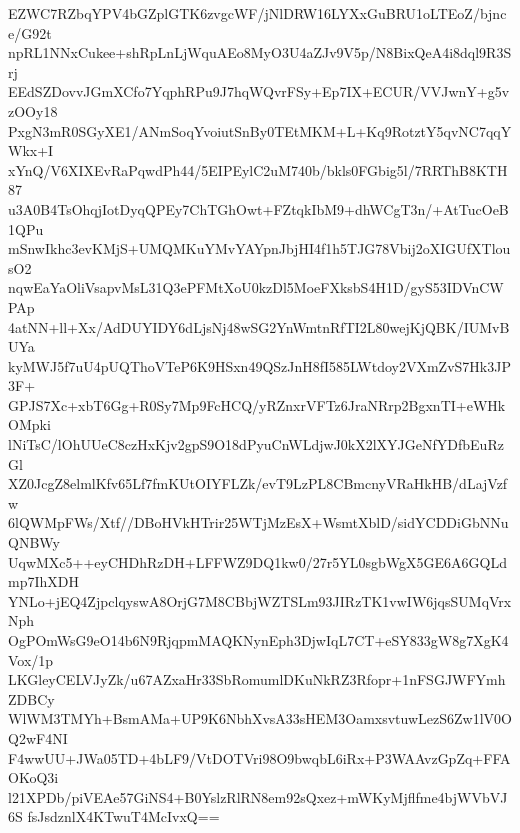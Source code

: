 EZWC7RZbqYPV4bGZplGTK6zvgcWF/jNlDRW16LYXxGuBRU1oLTEoZ/bjnce/G92t
npRL1NNxCukee+shRpLnLjWquAEo8MyO3U4aZJv9V5p/N8BixQeA4i8dql9R3Srj
EEdSZDovvJGmXCfo7YqphRPu9J7hqWQvrFSy+Ep7IX+ECUR/VVJwnY+g5vzOOy18
PxgN3mR0SGyXE1/ANmSoqYvoiutSnBy0TEtMKM+L+Kq9RotztY5qvNC7qqYWkx+I
xYnQ/V6XIXEvRaPqwdPh44/5EIPEylC2uM740b/bkls0FGbig5l/7RRThB8KTH87
u3A0B4TsOhqjIotDyqQPEy7ChTGhOwt+FZtqkIbM9+dhWCgT3n/+AtTucOeB1QPu
mSnwIkhc3evKMjS+UMQMKuYMvYAYpnJbjHI4f1h5TJG78Vbij2oXIGUfXTlousO2
nqwEaYaOliVsapvMsL31Q3ePFMtXoU0kzDl5MoeFXksbS4H1D/gyS53IDVnCWPAp
4atNN+ll+Xx/AdDUYIDY6dLjsNj48wSG2YnWmtnRfTI2L80wejKjQBK/IUMvBUYa
kyMWJ5f7uU4pUQThoVTeP6K9HSxn49QSzJnH8fI585LWtdoy2VXmZvS7Hk3JP3F+
GPJS7Xc+xbT6Gg+R0Sy7Mp9FcHCQ/yRZnxrVFTz6JraNRrp2BgxnTI+eWHkOMpki
lNiTsC/lOhUUeC8czHxKjv2gpS9O18dPyuCnWLdjwJ0kX2lXYJGeNfYDfbEuRzGl
XZ0JcgZ8elmlKfv65Lf7fmKUtOIYFLZk/evT9LzPL8CBmcnyVRaHkHB/dLajVzfw
6lQWMpFWs/Xtf//DBoHVkHTrir25WTjMzEsX+WsmtXblD/sidYCDDiGbNNuQNBWy
UqwMXc5++eyCHDhRzDH+LFFWZ9DQ1kw0/27r5YL0sgbWgX5GE6A6GQLdmp7IhXDH
YNLo+jEQ4ZjpclqyswA8OrjG7M8CBbjWZTSLm93JIRzTK1vwIW6jqsSUMqVrxNph
OgPOmWsG9eO14b6N9RjqpmMAQKNynEph3DjwIqL7CT+eSY833gW8g7XgK4Vox/1p
LKGleyCELVJyZk/u67AZxaHr33SbRomumlDKuNkRZ3Rfopr+1nFSGJWFYmhZDBCy
WlWM3TMYh+BsmAMa+UP9K6NbhXvsA33sHEM3OamxsvtuwLezS6Zw1lV0OQ2wF4NI
F4wwUU+JWa05TD+4bLF9/VtDOTVri98O9bwqbL6iRx+P3WAAvzGpZq+FFAOKoQ3i
l21XPDb/piVEAe57GiNS4+B0YslzRlRN8em92sQxez+mWKyMjflfme4bjWVbVJ6S
fsJsdznlX4KTwuT4McIvxQ==
